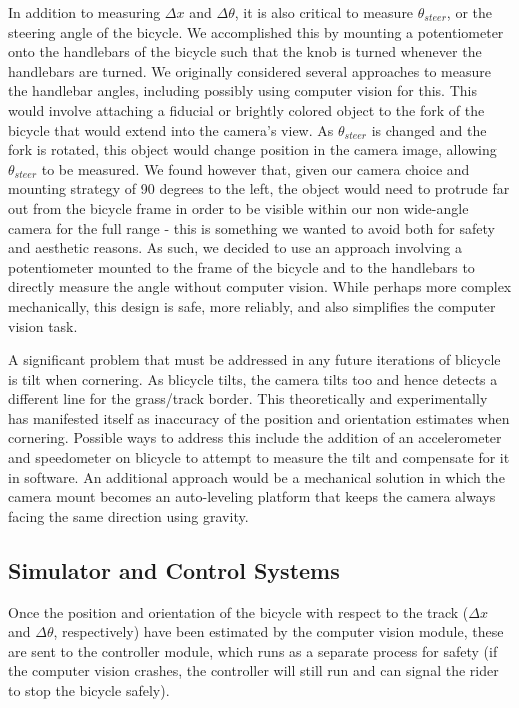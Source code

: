 \documentclass[aps,twocolumn,secnumarabic,balancelastpage,amsmath,amssymb,nofootinbib]{revtex4-1}
\begin{document}
In addition to measuring $\Delta x$ and $\Delta \theta$, it is also critical to measure $\theta_{steer}$, or the steering angle of the bicycle. We accomplished this by mounting a potentiometer onto the handlebars of the bicycle such that the knob is turned whenever the handlebars are turned. We originally considered several approaches to measure the handlebar angles, including possibly using computer vision for this. This would involve attaching a fiducial or brightly colored object to the fork of the bicycle that would extend into the camera's view. As $\theta_{steer}$ is changed and the fork is rotated, this object would change position in the camera image, allowing $\theta_{steer}$ to be measured. We found however that, given our camera choice and mounting strategy of 90 degrees to the left, the object would need to protrude far out from the bicycle frame in order to be visible within our non wide-angle camera for the full range - this is something we wanted to avoid both for safety and aesthetic reasons. As such, we decided to use an approach involving a potentiometer mounted to the frame of the bicycle and to the handlebars to directly measure the angle without computer vision. While perhaps more complex mechanically, this design is safe, more reliably, and also simplifies the computer vision task.

A significant problem that must be addressed in any future iterations of blicycle is tilt when cornering. As blicycle tilts, the camera tilts too and hence detects a different line for the grass/track border. This theoretically and experimentally has manifested itself as inaccuracy of the position and orientation estimates when cornering. Possible ways to address this include the addition of an accelerometer and speedometer on blicycle to attempt to measure the tilt and compensate for it in software. An additional approach would be a mechanical solution in which the camera mount becomes an auto-leveling platform that keeps the camera always facing the same direction using gravity.

\subsection{Simulator and Control Systems}
Once the position and orientation of the bicycle with respect to the track ($\Delta x$ and $\Delta \theta$, respectively) have been estimated by the computer vision module, these are sent to the controller module, which runs as a separate process for safety (if the computer vision crashes, the controller will still run and can signal the rider to stop the bicycle safely).
\end{document}
